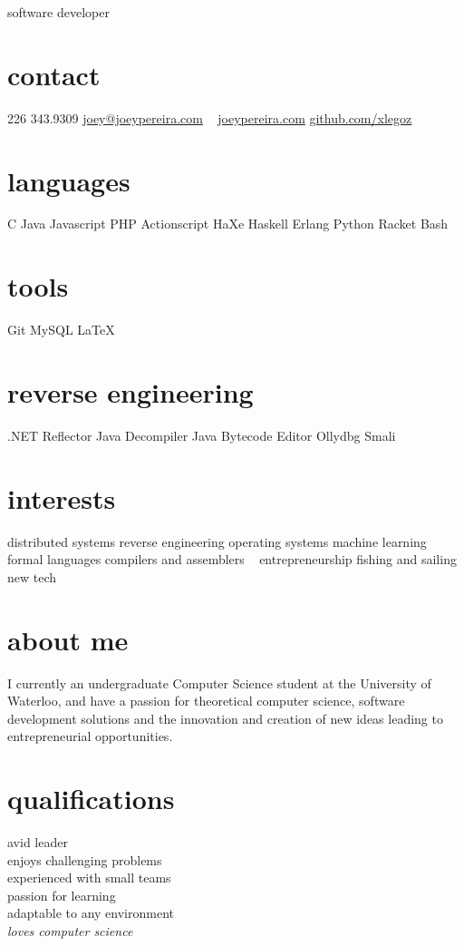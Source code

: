 \documentclass[]{friggeri-cv}
\begin{document}
       {software developer}

\begin{aside}
  \section{contact}
    226 343.9309
    \href{mailto:joey@joeypereira.com}{joey@joeypereira.com}
    ~
    \href{http://joeypereira.com}{joeypereira.com}
    \href{http://www.github.com/xlegoz}{github.com/xlegoz}
  \section{languages}
	C
	Java
	Javascript
	PHP
	Actionscript
	HaXe
	Haskell
	Erlang
	Python
	Racket
	Bash	
  \section{tools}
	Git
    MySQL
    \LaTeX
  \section{reverse engineering}
  	.NET Reflector
  	Java Decompiler
  	Java Bytecode Editor
  	Ollydbg
  	Smali
  \section{interests}
  	distributed systems
  	reverse engineering
  	operating systems
  	machine learning
  	formal languages
  	compilers and assemblers
  	~
  	entrepreneurship
  	fishing and sailing
  	new tech
\end{aside}


\section{about me}
I currently an undergraduate Computer Science student at the University of Waterloo, and have a passion for theoretical computer science, software development solutions and the innovation and creation of new ideas leading to entrepreneurial opportunities.
\section{qualifications}
\begin{multicols}{3}
 avid leader \\ enjoys challenging problems \\ experienced with small teams \\ passion for learning \\ adaptable to any environment \\ \em{loves} computer science
\end{multicols}
\end{document}
